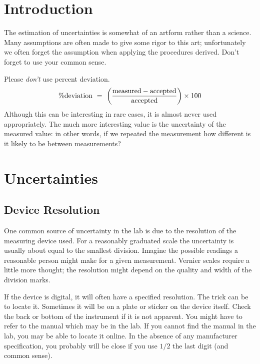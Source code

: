 \section{Introduction}

The estimation of uncertainties is somewhat of an artform rather than a science. 
Many assumptions are often made to give some rigor to this art; unfortunately we
often forget the assumption when applying the procedures derived.  Don't forget
to use your common sense.

Please {\em don't} use percent deviation.  
\begin{equation}
\% {\rm deviation} ~=~ \left({{ \rm measured} - {\rm accepted } \over {\rm accepted }}\right) \times 100
\end{equation}
Although this can be interesting in rare cases, it is almost never used
appropriately.  The much more interesting value is the uncertainty of the
measured value: in other words, if we repeated the measurement how different is
it likely to be between measurements? 

\section{Uncertainties}

\subsection{Device Resolution}

One common source of uncertainty in the lab is due to the resolution of the
measuring device used.
For a reasonably graduated scale the uncertainty is usually about equal to the
smallest division.  Imagine the possible readings a reasonable person might make
for a given measurement.  Vernier scales require a little more thought; the
resolution might depend on the quality and width of the division marks.

If the device is digital, it will often have a specified resolution.  The trick
can be to locate it.  Sometimes it will be on a plate or sticker on the device
itself.  Check the back or bottom of the instrument if it is not apparent.  You
might have to refer to the manual which may be in the lab.  If you cannot find
the manual in the lab, you may be able to locate it online.  In the absence of
any manufacturer specification, you probably will be close if you use $1/2$ the
last digit (and common sense).

